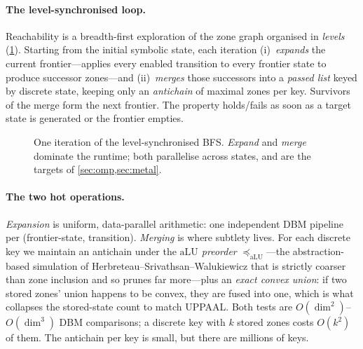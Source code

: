 \documentclass[11pt]{article}
\newcommand{\aluleq}{\ensuremath{\preceq_{\mathrm{aLU}}}}
\begin{document}
\paragraph{The level-synchronised loop.} Reachability is a breadth-first exploration of the zone
graph organised in \emph{levels} (\cref{fig:loop}). Starting from the initial symbolic state, each
iteration (i)~\emph{expands} the current frontier---applies every enabled transition to every
frontier state to produce successor zones---and (ii)~\emph{merges} those successors into a
\emph{passed list} keyed by discrete state, keeping only an \emph{antichain} of maximal zones per
key. Survivors of the merge form the next frontier. The property holds/fails as soon as a target
state is generated or the frontier empties.

\begin{figure}[t]
\centering
{}
\caption{One iteration of the level-synchronised BFS. \emph{Expand} and \emph{merge} dominate the
runtime; both parallelise across states, and are the targets of \cref{sec:omp,sec:metal}.}
\label{fig:loop}
\end{figure}

\paragraph{The two hot operations.}
\emph{Expansion} is uniform, data-parallel arithmetic: one independent DBM pipeline per
(frontier-state, transition). \emph{Merging} is where subtlety lives. For each discrete key we
maintain an antichain under the \emph{$\text{aLU}$ preorder} \aluleq{}---the abstraction-based
simulation of Herbreteau–Srivathsan–Walukiewicz that is strictly coarser than zone inclusion and
so prunes far more---plus an \emph{exact convex union}: if two stored zones' union happens to be
convex, they are fused into one, which is what collapses the stored-state count to match UPPAAL.
Both tests are $O(\dim^2)$--$O(\dim^3)$ DBM comparisons; a discrete key with $k$ stored zones costs
$O(k^2)$ of them. The antichain per key is small, but there are millions of keys.
\end{document}
